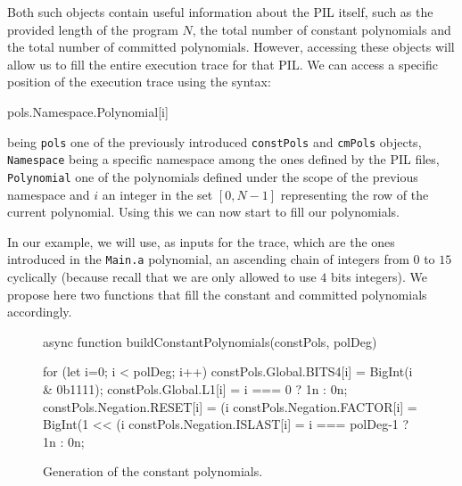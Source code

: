 Both such objects contain useful information about the PIL itself, such as the provided length of the program $N$, the total number of constant polynomials and the total number of committed polynomials. However, accessing these objects will allow us to fill the entire execution trace for that PIL. We can access a specific position of the execution trace using the syntax:
\begin{js}
    pols.Namespace.Polynomial[i] 
\end{js}
being \texttt{pols} one of the previously introduced \texttt{constPols} and \texttt{cmPols} objects, \texttt{Namespace} being a specific namespace among the ones defined by the PIL files, \texttt{Polynomial} one of the polynomials defined under the scope of the previous namespace and $i$ an integer in the set $[0,N-1]$ representing the row of the current polynomial. Using this we can now start to fill our polynomials. 

In our example, we will use, as inputs for the trace, which are the ones introduced in the \texttt{Main.a} polynomial, an ascending chain of integers from $0$ to $15$ cyclically (because recall that we are only allowed to use $4$ bits integers). We propose here two functions that fill the constant and committed polynomials accordingly. 
\begin{figure}[H]
    \begin{js}
        async function buildConstantPolynomials(constPols, polDeg) {
            
            for (let i=0; i < polDeg; i++) {
                constPols.Global.BITS4[i] = BigInt(i & 0b1111);
                constPols.Global.L1[i] = i === 0 ? 1n : 0n;
                constPols.Negation.RESET[i] = (i %
                constPols.Negation.FACTOR[i] = BigInt(1 << (i %
                constPols.Negation.ISLAST[i] = i === polDeg-1 ? 1n : 0n;
            }
        }
    \end{js}
    \caption{Generation of the constant polynomials.}
\end{figure}

